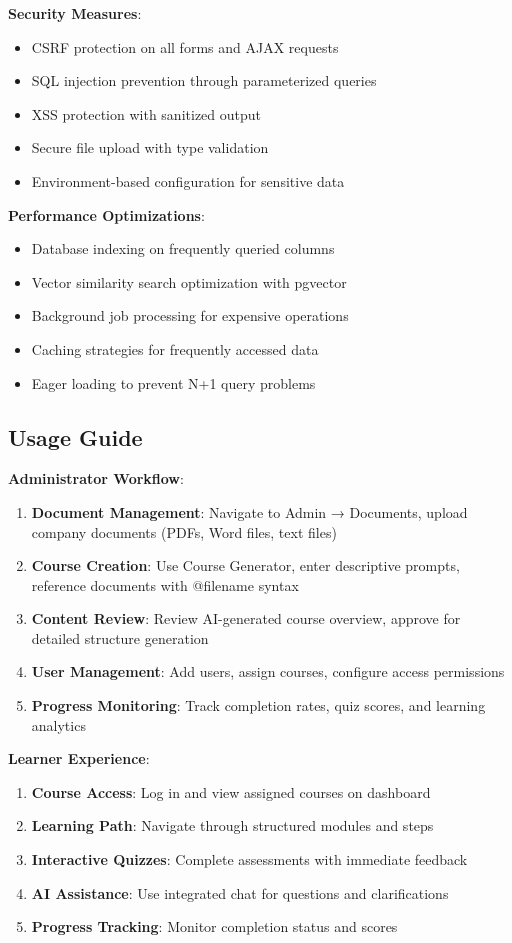 \documentclass[a4paper,11pt]{article}
\begin{document}
\textbf{Security Measures}:
\begin{itemize}
    \item CSRF protection on all forms and AJAX requests
    \item SQL injection prevention through parameterized queries
    \item XSS protection with sanitized output
    \item Secure file upload with type validation
    \item Environment-based configuration for sensitive data
\end{itemize}

\textbf{Performance Optimizations}:
\begin{itemize}
    \item Database indexing on frequently queried columns
    \item Vector similarity search optimization with pgvector
    \item Background job processing for expensive operations
    \item Caching strategies for frequently accessed data
    \item Eager loading to prevent N+1 query problems
\end{itemize}

\subsection{Usage Guide}

\textbf{Administrator Workflow}:
\begin{enumerate}
    \item \textbf{Document Management}: Navigate to Admin → Documents, upload company documents (PDFs, Word files, text files)
    \item \textbf{Course Creation}: Use Course Generator, enter descriptive prompts, reference documents with @filename syntax
    \item \textbf{Content Review}: Review AI-generated course overview, approve for detailed structure generation
    \item \textbf{User Management}: Add users, assign courses, configure access permissions
    \item \textbf{Progress Monitoring}: Track completion rates, quiz scores, and learning analytics
\end{enumerate}

\textbf{Learner Experience}:
\begin{enumerate}
    \item \textbf{Course Access}: Log in and view assigned courses on dashboard
    \item \textbf{Learning Path}: Navigate through structured modules and steps
    \item \textbf{Interactive Quizzes}: Complete assessments with immediate feedback
    \item \textbf{AI Assistance}: Use integrated chat for questions and clarifications
    \item \textbf{Progress Tracking}: Monitor completion status and scores
\end{enumerate}
\end{document}
